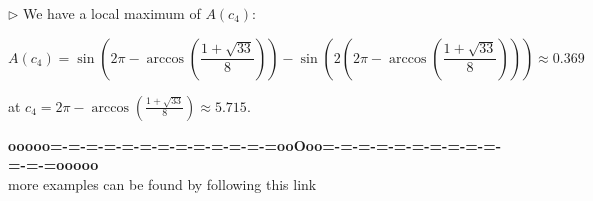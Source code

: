 \documentclass{ximera}
\begin{document}
$\rhd$ We have a local maximum of $A(c_4)$:


\[  A(c_4) = \sin\left(   2\pi - \arccos\left(\frac{1 + \sqrt{33}}{8}\right)   \right) - \sin\left(2  (2\pi - \arccos\left(\frac{1 + \sqrt{33}}{8}\right))  \right)  \approx 0.369  \]




at $c_4 = 2\pi - \arccos\left(\frac{1 + \sqrt{33}}{8}\right) \approx 5.715$.   \\











\begin{center}
\textbf{\textcolor{green!50!black}{ooooo=-=-=-=-=-=-=-=-=-=-=-=-=ooOoo=-=-=-=-=-=-=-=-=-=-=-=-=ooooo}} \\

more examples can be found by following this link\\ 

\end{center}
\end{document}
